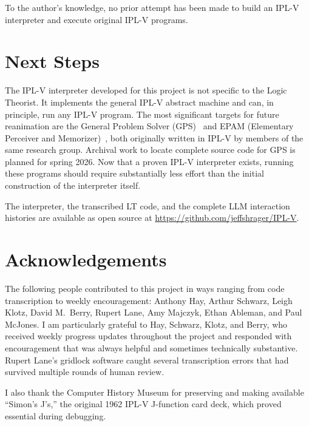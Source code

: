 \documentclass[journal]{IEEEtran}
\begin{document}
To the author's knowledge, no prior attempt has been made to build an
IPL-V interpreter and execute original IPL-V programs.

\section{Next Steps}
\label{sec:next}

The IPL-V interpreter developed for this project is not specific to
the Logic Theorist. It implements the general IPL-V abstract machine
and can, in principle, run any IPL-V program. The most significant
targets for future reanimation are the General Problem Solver
(GPS)~\cite{newell1959gps} and EPAM (Elementary Perceiver and
Memorizer)~\cite{feigenbaum1961epam}, both originally written in
IPL-V by members of the same research group. Archival work to locate
complete source code for GPS is planned for spring 2026. Now that a
proven IPL-V interpreter exists, running these programs should require
substantially less effort than the initial construction of the
interpreter itself.

The interpreter, the transcribed LT code, and the complete LLM
interaction histories are available as open source at
\url{https://github.com/jeffshrager/IPL-V}.

\section{Acknowledgements}

The following people contributed to this project in ways ranging from
code transcription to weekly encouragement: Anthony Hay, Arthur
Schwarz, Leigh Klotz, David M.\ Berry, Rupert Lane, Amy Majczyk,
Ethan Ableman, and Paul McJones. I am particularly grateful to Hay,
Schwarz, Klotz, and Berry, who received weekly progress updates
throughout the project and responded with encouragement that was
always helpful and sometimes technically substantive. Rupert Lane's
gridlock software caught several transcription errors that had
survived multiple rounds of human review.

I also thank the Computer History Museum for preserving and making
available ``Simon's J's,'' the original 1962 IPL-V J-function card
deck, which proved essential during debugging.
\end{document}
